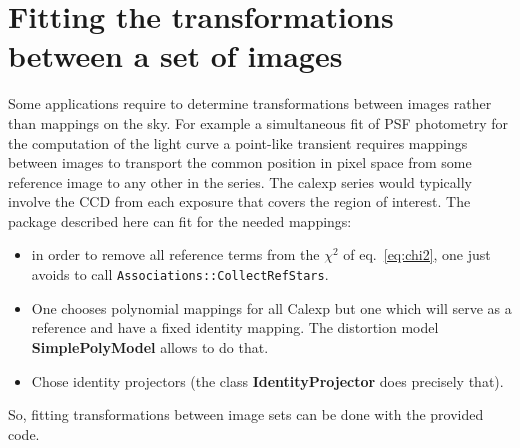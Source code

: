 \documentclass[a4paper,12pt]{scrartcl}
\newcommand{\ClName}[1]{{\bf #1}}
\newcommand{\RoutineName}[1]{\texttt{#1}}
\def\bf{\normalfont\bfseries}
\begin{document}
\section{Fitting the transformations between a set of images}
Some applications require to determine transformations between images
rather than mappings on the sky. For example a simultaneous fit of PSF
photometry for the computation of the light curve a point-like
transient requires mappings between images to transport the common
position in pixel space from some reference image to any other
in the series. The calexp series would typically involve
the CCD from each exposure that covers the region of interest.
The package described here can fit for the needed mappings:
\begin{itemize}
\item in order to remove all reference terms from the $\chi^2$ of eq.~\ref{eq:chi2},
one just avoids to call \RoutineName{Associations::CollectRefStars}.
\item One chooses polynomial mappings for all Calexp 
  but one which will serve as a reference and have a fixed identity mapping.
The distortion model \ClName{SimplePolyModel} allows to do that.
\item Chose identity projectors (the class \ClName{IdentityProjector} does precisely that).
\end{itemize}
So, fitting transformations between image sets can be done with
the provided code. 
\end{document}
